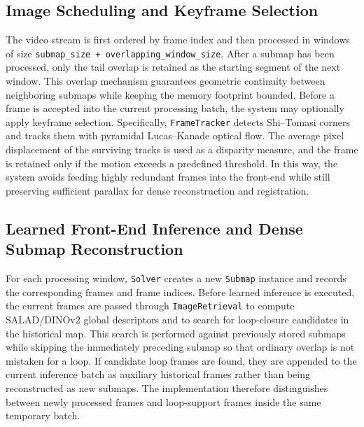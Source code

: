 \subsection{Image Scheduling and Keyframe Selection}
The video stream is first ordered by frame index and then processed in windows of size \texttt{submap\_size + overlapping\_window\_size}. After a submap has been processed, only the tail overlap is retained as the starting segment of the next window. This overlap mechanism guarantees geometric continuity between neighboring submaps while keeping the memory footprint bounded. Before a frame is accepted into the current processing batch, the system may optionally apply keyframe selection. Specifically, \texttt{FrameTracker} detects Shi--Tomasi corners and tracks them with pyramidal Lucas--Kanade optical flow. The average pixel displacement of the surviving tracks is used as a disparity measure, and the frame is retained only if the motion exceeds a predefined threshold. In this way, the system avoids feeding highly redundant frames into the front-end while still preserving sufficient parallax for dense reconstruction and registration.

\subsection{Learned Front-End Inference and Dense Submap Reconstruction}
For each processing window, \texttt{Solver} creates a new \texttt{Submap} instance and records the corresponding frames and frame indices. Before learned inference is executed, the current frames are passed through \texttt{ImageRetrieval} to compute SALAD/DINOv2 global descriptors and to search for loop-closure candidates in the historical map. This search is performed against previously stored submaps while skipping the immediately preceding submap so that ordinary overlap is not mistaken for a loop. If candidate loop frames are found, they are appended to the current inference batch as auxiliary historical frames rather than being reconstructed as new submaps. The implementation therefore distinguishes between newly processed frames and loop-support frames inside the same temporary batch.

